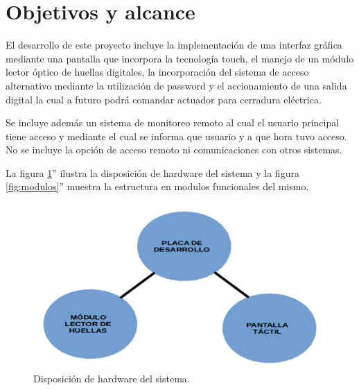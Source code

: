 

\section{Objetivos y alcance}

El desarrollo de este proyecto incluye la implementación de una interfaz gráfica mediante una pantalla que incorpora la tecnología touch, el manejo de un módulo lector óptico de huellas digitales, la incorporación del sistema de acceso alternativo mediante la utilización de password y el accionamiento de una salida digital la cual a futuro podrá comandar actuador para cerradura eléctrica.

Se incluye además un sistema de monitoreo remoto al cual el usuario principal tiene acceso y mediante el cual se informa que usuario y a que hora tuvo acceso.
No se incluye la opción de acceso remoto ni comunicaciones con otros sistemas.

La figura \ref{fig:hard_disp}'' ilustra la disposición de hardware del sistema y la figura \ref{fig:modulos}'' muestra la estructura en modulos funcionales del mismo.

\begin{figure}[h]
	\centering
	\includegraphics[scale=.26]{./Figures/hard_disp.png}
	\caption{Disposición de hardware del sistema.}
	\label{fig:hard_disp}
\end{figure}

